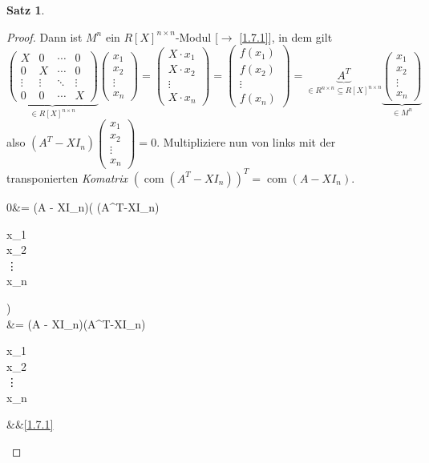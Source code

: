 \documentclass[
twoside=semi,
fontsize=12,
DIV=12, 
cleardoublepage=current,
leqno,
headings=optiontoheadandtoc, 
toc=idx
]{scrbook}
\newcommand{\brac}[1]{\left( #1 \right)}
\DeclareMathOperator{\com}{com}
\theoremstyle{definition}
\newtheorem{satz}[definition]{Satz}
\begin{document}
\begin{satz}
\begin{proof}
			Dann ist $M^n$ ein $R[X]^{n\times n}$-Modul [$\to$ \ref{1.7.1}], in dem gilt 
			\[\underbrace{\begin{pmatrix}
					X & 0 & \cdots & 0\\
					0 & X & \cdots & 0\\
					\vdots & \vdots & \ddots & \vdots\\
					0 & 0 & \cdots & X
			\end{pmatrix}}_{\in R[X]^{n\times n}} \begin{pmatrix}
		x_1\\x_2\\\vdots\\x_n
		\end{pmatrix} = \begin{pmatrix}
		X \cdot x_1\\X \cdot x_2\\\vdots\\X \cdot x_n
		\end{pmatrix} = \begin{pmatrix}
		f(x_1)\\f(x_2)\\\vdots\\f(x_n)
		\end{pmatrix} = \underbrace{A^T}_{\in R^{n\times n} \subseteq R[X]^{n\times n}}\underbrace{\begin{pmatrix}
			x_1\\x_2\\\vdots\\x_n
		\end{pmatrix}}_{\in M^n}\] 
		also  $(A^T-XI_n)\begin{pmatrix}x_1\\x_2\\\vdots\\x_n\end{pmatrix} = 0$. Multipliziere nun von links mit der transponierten \emph{Komatrix} $\brac{\com(A^T - XI_n)}^T = \com(A-XI_n)$.
		\begin{flalign*}
			0&= \com(A - XI_n)\brac{(A^T-XI_n)\begin{pmatrix}x_1\\x_2\\\vdots\\x_n\end{pmatrix}}\\
			&=  \com(A - XI_n)(A^T-XI_n)\begin{pmatrix}x_1\\x_2\\\vdots\\x_n\end{pmatrix}   &&\ref{1.7.1}\\

\end{flalign*}
\end{proof}
\end{satz}
\end{document}
